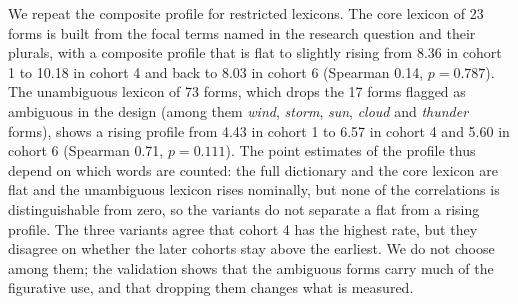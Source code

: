 \documentclass[11pt]{article}
\begin{document}
We repeat the composite profile for restricted lexicons. The core lexicon of 23 forms is built from the focal terms named in the research question and their plurals, with a composite profile that is flat to slightly rising from 8.36 in cohort 1 to 10.18 in cohort 4 and back to 8.03 in cohort 6 (Spearman 0.14, $p=0.787$).
The unambiguous lexicon of 73 forms, which drops the 17 forms flagged as ambiguous in the design (among them \emph{wind}, \emph{storm}, \emph{sun}, \emph{cloud} and \emph{thunder} forms), shows a rising profile from 4.43 in cohort 1 to 6.57 in cohort 4 and 5.60 in cohort 6 (Spearman 0.71, $p=0.111$).
The point estimates of the profile thus depend on which words are counted: the full dictionary and the core lexicon are flat and the unambiguous lexicon rises nominally, but none of the correlations is distinguishable from zero, so the variants do not separate a flat from a rising profile. The three variants agree that cohort 4 has the highest rate, but they disagree on whether the later cohorts stay above the earliest. We do not choose among them; the validation shows that the ambiguous forms carry much of the figurative use, and that dropping them changes what is measured.
\end{document}
